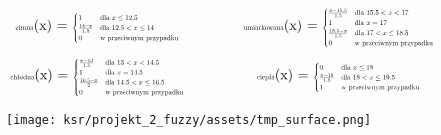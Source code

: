 \documentclass{article}
\begin{document}
\begin{equation*}
\begin{minipage}{0.5\textwidth}
\centering
\text{\scalebox{0.5}{zimna}}(x) = \scalebox{0.5}{$
\begin{cases}
1 & \text{dla } x \leq 12.5 \\
\frac{14 - x}{1.5} & \text{dla } 12.5 < x \leq 14 \\
0 & \text{w przeciwnym przypadku}
\end{cases}
$}
\end{minipage}%
\begin{minipage}{0.5\textwidth}
\centering
\text{\scalebox{0.5}{umiarkowana}}(x) = \scalebox{0.5}{$
\begin{cases}
\frac{x - 15.5}{1.5} & \text{dla } 15.5 < x < 17 \\
1 & \text{dla } x = 17 \\
\frac{18.5 - x}{1.5} & \text{dla } 17 < x \leq 18.5 \\
0 & \text{w przeciwnym przypadku}
\end{cases}
$}
\end{minipage}
\end{equation*}
\begin{equation*}
\begin{minipage}{0.5\textwidth}
\centering
\text{\scalebox{0.5}{chłodna}}(x) = \scalebox{0.5}{$
\begin{cases}
\frac{x - 13}{1.5} & \text{dla } 13 < x < 14.5 \\
1 & \text{dla } x = 14.5 \\
\frac{16.5 - x}{2} & \text{dla } 14.5 < x \leq 16.5 \\
0 & \text{w przeciwnym przypadku}
\end{cases}
$}
\end{minipage}%
\begin{minipage}{0.5\textwidth}
\centering
\text{\scalebox{0.5}{ciepła}}(x) = \scalebox{0.5}{$
\begin{cases}
0 & \text{dla } x \leq 18 \\
\frac{x - 18}{1.5} & \text{dla } 18 < x \leq 19.5 \\
1 & \text{w przeciwnym przypadku}
\end{cases}
$}
\end{minipage}
\end{equation*}




\begin{figure}[H]
\centering
\texttt{[image: ksr/projekt\_2\_fuzzy/assets/tmp\_surface.png]}
\label{fig:epsilon_bat}
\end{figure}
\end{document}
